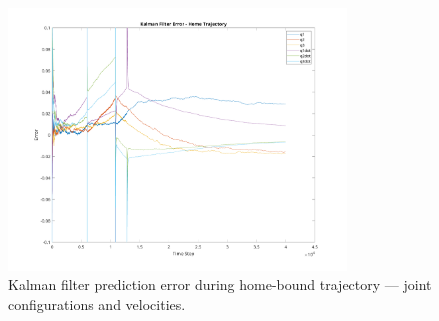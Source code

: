 \begin{figure}[H]
  \centering
  \includegraphics[width=0.8\textwidth]{figures/kf_error_home.png}
  \caption{Kalman filter prediction error during home-bound trajectory --- joint configurations and velocities.}
  \label{fig:kferror-home}
\end{figure}
